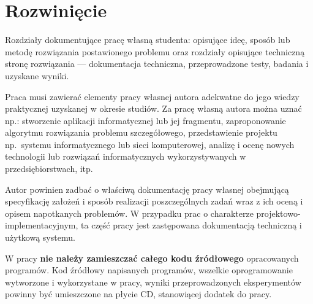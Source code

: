 
\chapter{}
\chapter{}
\chapter{}
\chapter{}
\chapter{}


\chapter{Rozwinięcie}

Rozdziały dokumentujące pracę własną studenta: opisujące ideę, sposób lub metodę 
rozwiązania postawionego problemu oraz rozdziały opisujące techniczną stronę rozwiązania 
--- dokumentacja techniczna, przeprowadzone testy, badania i uzyskane wyniki. 

Praca musi zawierać elementy pracy własnej autora adekwatne do jego wiedzy praktycznej uzyskanej w
okresie studiów. Za pracę własną autora można uznać np.: stworzenie aplikacji informatycznej lub jej
fragmentu, zaproponowanie algorytmu rozwiązania problemu szczegółowego, przedstawienie projektu 
np.~systemu informatycznego lub sieci komputerowej, analizę i ocenę nowych technologii lub rozwiązań
informatycznych wykorzystywanych w przedsiębiorstwach, itp. 

Autor powinien zadbać o właściwą dokumentację pracy własnej obejmującą specyfikację założeń i 
sposób realizacji poszczególnych zadań
wraz z ich oceną i opisem napotkanych problemów. W przypadku prac o charakterze 
projektowo-implementacyjnym, ta część pracy jest zastępowana dokumentacją techniczną i użytkową systemu. 

W pracy \textbf{nie należy zamieszczać całego kodu źródłowego} opracowanych programów. Kod źródłowy napisanych
programów, wszelkie oprogramowanie wytworzone i wykorzystane w pracy, wyniki przeprowadzonych
eksperymentów powinny być umieszczone na płycie CD, stanowiącej dodatek do pracy.

